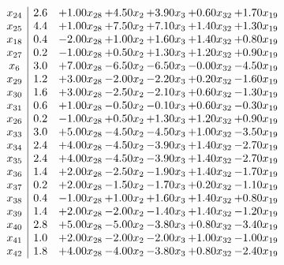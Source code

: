\documentclass[8pt]{article}
\begin{document}
\[\begin{array}{c| c c@{\hskip 2pt} c@{\hskip 2pt} c@{\hskip 2pt} c@{\hskip 2pt} c@{\hskip 2pt} }
 x_{24}   &  2.6 & +  1.00 x_{28} & +  4.50 x_{2} & +  3.90 x_{3} & +  0.60 x_{32} & +  1.70 x_{19}\\
 x_{25}   &  4.4 & +  1.00 x_{28} & +  7.50 x_{2} & +  7.10 x_{3} & +  1.40 x_{32} & +  1.30 x_{19}\\
 x_{18}   &  0.4 & -2.00 x_{28} & +  1.00 x_{2} & +  1.60 x_{3} & +  1.40 x_{32} & +  0.80 x_{19}\\
 x_{27}   &  0.2 & -1.00 x_{28} & +  0.50 x_{2} & +  1.30 x_{3} & +  1.20 x_{32} & +  0.90 x_{19}\\
 x_{6}   &  3.0 & +  7.00 x_{28} & -6.50 x_{2} & -6.50 x_{3} & -0.00 x_{32} & -4.50 x_{19}\\
 x_{29}   &  1.2 & +  3.00 x_{28} & -2.00 x_{2} & -2.20 x_{3} & +  0.20 x_{32} & -1.60 x_{19}\\
 x_{30}   &  1.6 & +  3.00 x_{28} & -2.50 x_{2} & -2.10 x_{3} & +  0.60 x_{32} & -1.30 x_{19}\\
 x_{31}   &  0.6 & +  1.00 x_{28} & -0.50 x_{2} & -0.10 x_{3} & +  0.60 x_{32} & -0.30 x_{19}\\
 x_{26}   &  0.2 & -1.00 x_{28} & +  0.50 x_{2} & +  1.30 x_{3} & +  1.20 x_{32} & +  0.90 x_{19}\\
 x_{33}   &  3.0 & +  5.00 x_{28} & -4.50 x_{2} & -4.50 x_{3} & +  1.00 x_{32} & -3.50 x_{19}\\
 x_{34}   &  2.4 & +  4.00 x_{28} & -4.50 x_{2} & -3.90 x_{3} & +  1.40 x_{32} & -2.70 x_{19}\\
 x_{35}   &  2.4 & +  4.00 x_{28} & -4.50 x_{2} & -3.90 x_{3} & +  1.40 x_{32} & -2.70 x_{19}\\
 x_{36}   &  1.4 & +  2.00 x_{28} & -2.50 x_{2} & -1.90 x_{3} & +  1.40 x_{32} & -1.70 x_{19}\\
 x_{37}   &  0.2 & +  2.00 x_{28} & -1.50 x_{2} & -1.70 x_{3} & +  0.20 x_{32} & -1.10 x_{19}\\
 x_{38}   &  0.4 & -1.00 x_{28} & +  1.00 x_{2} & +  1.60 x_{3} & +  1.40 x_{32} & +  0.80 x_{19}\\
 x_{39}   &  1.4 & +  2.00 x_{28} & -2.00 x_{2} & -1.40 x_{3} & +  1.40 x_{32} & -1.20 x_{19}\\
 x_{40}   &  2.8 & +  5.00 x_{28} & -5.00 x_{2} & -3.80 x_{3} & +  0.80 x_{32} & -3.40 x_{19}\\
 x_{41}   &  1.0 & +  2.00 x_{28} & -2.00 x_{2} & -2.00 x_{3} & +  1.00 x_{32} & -1.00 x_{19}\\
 x_{42}   &  1.8 & +  4.00 x_{28} & -4.00 x_{2} & -3.80 x_{3} & +  0.80 x_{32} & -2.40 x_{19}\\

\end{array}\]
\end{document}
